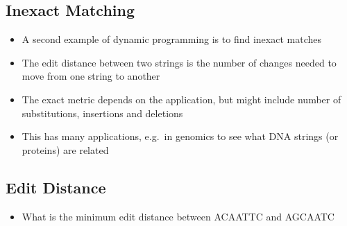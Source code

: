 \begin{slide}
\section{Inexact Matching}

\begin{PauseHighLight}
  \begin{itemize}
  \item A second example of dynamic programming is to find inexact
    matches\pause
  \item The edit distance between two strings is the number of changes
    needed to move from one string to another\pause
  \item The exact metric depends on the application, but might include
    number of substitutions, insertions and deletions\pause
  \item This has many applications, e.g.\ in genomics to see what DNA
    strings (or proteins) are related\pause
  \end{itemize}
\end{PauseHighLight}

\end{slide}


\begin{slide}
\section[-2]{Edit Distance}

\pb
\begin{itemize}
\item What is the minimum edit distance between ACAATTC and AGCAATC\pauseh{}
\end{itemize}
\begin{center}
  \pause
\end{center}
\end{slide}



